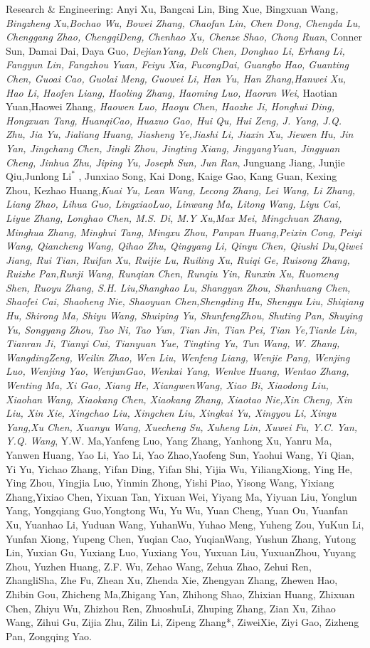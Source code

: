 \documentclass[
  10
]{article}
\begin{document}
Research \& Engineering: Anyi Xu, Bangcai Lin, Bing Xue, Bingxuan
Wang\emph{, Bingzheng Xu,Bochao Wu, Bowei Zhang, Chaofan Lin, Chen Dong,
Chengda Lu, Chenggang Zhao, ChengqiDeng, Chenhao Xu, Chenze Shao, Chong
Ruan}, Conner Sun, Damai Dai, Daya Guo\emph{, DejianYang, Deli Chen,
Donghao Li, Erhang Li, Fangyun Lin, Fangzhou Yuan, Feiyu Xia, FucongDai,
Guangbo Hao, Guanting Chen, Guoai Cao, Guolai Meng, Guowei Li, Han Yu,
Han Zhang,Hanwei Xu, Hao Li, Haofen Liang, Haoling Zhang, Haoming Luo,
Haoran Wei}, Haotian Yuan,Haowei Zhang\emph{, Haowen Luo, Haoyu Chen,
Haozhe Ji, Honghui Ding, Hongxuan Tang, HuanqiCao, Huazuo Gao, Hui Qu,
Hui Zeng, J. Yang, J.Q. Zhu, Jia Yu, Jialiang Huang, Jiasheng Ye,Jiashi
Li, Jiaxin Xu, Jiewen Hu, Jin Yan, Jingchang Chen, Jingli Zhou, Jingting
Xiang, JingyangYuan, Jingyuan Cheng, Jinhua Zhu, Jiping Yu, Joseph Sun,
Jun Ran}, Junguang Jiang, Junjie Qiu,Junlong
\({ \mathrm { L i } } ^ { * }\) , Junxiao Song, Kai Dong, Kaige Gao,
Kang Guan, Kexing Zhou, Kezhao Huang\emph{,Kuai Yu, Lean Wang, Lecong
Zhang, Lei Wang, Li Zhang, Liang Zhao, Lihua Guo, LingxiaoLuo, Linwang
Ma, Litong Wang, Liyu Cai, Liyue Zhang, Longhao Chen, M.S. Di, M.Y
Xu,Max Mei, Mingchuan Zhang, Minghua Zhang, Minghui Tang, Mingxu Zhou,
Panpan Huang,Peixin Cong, Peiyi Wang, Qiancheng Wang, Qihao Zhu,
Qingyang Li, Qinyu Chen, Qiushi Du,Qiwei Jiang, Rui Tian, Ruifan Xu,
Ruijie Lu, Ruiling Xu, Ruiqi Ge, Ruisong Zhang, Ruizhe Pan,Runji Wang,
Runqian Chen, Runqiu Yin, Runxin Xu, Ruomeng Shen, Ruoyu Zhang, S.H.
Liu,Shanghao Lu, Shangyan Zhou, Shanhuang Chen, Shaofei Cai, Shaoheng
Nie, Shaoyuan Chen,Shengding Hu, Shengyu Liu, Shiqiang Hu, Shirong Ma,
Shiyu Wang, Shuiping Yu, ShunfengZhou, Shuting Pan, Shuying Yu, Songyang
Zhou, Tao Ni, Tao Yun, Tian Jin, Tian Pei, Tian Ye,Tianle Lin, Tianran
Ji, Tianyi Cui, Tianyuan Yue, Tingting Yu, Tun Wang, W. Zhang,
WangdingZeng, Weilin Zhao, Wen Liu, Wenfeng Liang, Wenjie Pang, Wenjing
Luo, Wenjing Yao, WenjunGao, Wenkai Yang, Wenlve Huang, Wentao Zhang,
Wenting Ma, Xi Gao, Xiang He, XiangwenWang, Xiao Bi, Xiaodong Liu,
Xiaohan Wang, Xiaokang Chen, Xiaokang Zhang, Xiaotao Nie,Xin Cheng, Xin
Liu, Xin Xie, Xingchao Liu, Xingchen Liu, Xingkai Yu, Xingyou Li, Xinyu
Yang,Xu Chen, Xuanyu Wang, Xuecheng Su, Xuheng Lin, Xuwei Fu, Y.C. Yan,
Y.Q. Wang}, Y.W. Ma,Yanfeng Luo, Yang Zhang, Yanhong Xu, Yanru Ma,
Yanwen Huang, Yao Li, Yao Li, Yao Zhao,Yaofeng Sun, Yaohui Wang, Yi
Qian, Yi Yu, Yichao Zhang, Yifan Ding, Yifan Shi, Yijia Wu,
YiliangXiong, Ying He, Ying Zhou, Yingjia Luo, Yinmin Zhong, Yishi Piao,
Yisong Wang, Yixiang Zhang,Yixiao Chen, Yixuan Tan, Yixuan Wei, Yiyang
Ma, Yiyuan Liu, Yonglun Yang, Yongqiang Guo,Yongtong Wu, Yu Wu, Yuan
Cheng, Yuan Ou, Yuanfan Xu, Yuanhao Li, Yuduan Wang, YuhanWu, Yuhao
Meng, Yuheng Zou, YuKun Li, Yunfan Xiong, Yupeng Chen, Yuqian Cao,
YuqianWang, Yushun Zhang, Yutong Lin, Yuxian Gu, Yuxiang Luo, Yuxiang
You, Yuxuan Liu, YuxuanZhou, Yuyang Zhou, Yuzhen Huang, Z.F. Wu, Zehao
Wang, Zehua Zhao, Zehui Ren, ZhangliSha, Zhe Fu, Zhean Xu, Zhenda Xie,
Zhengyan Zhang, Zhewen Hao, Zhibin Gou, Zhicheng Ma,Zhigang Yan, Zhihong
Shao, Zhixian Huang, Zhixuan Chen, Zhiyu Wu, Zhizhou Ren, ZhuoshuLi,
Zhuping Zhang, Zian Xu, Zihao Wang, Zihui Gu, Zijia Zhu, Zilin Li,
Zipeng Zhang*, ZiweiXie, Ziyi Gao, Zizheng Pan, Zongqing Yao.
\end{document}
